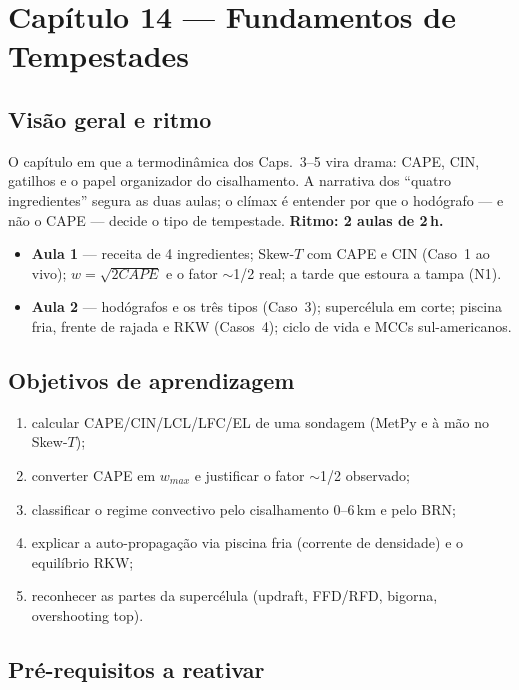 \section{Capítulo 14 --- Fundamentos de Tempestades}

\subsection*{Visão geral e ritmo}

O capítulo em que a termodinâmica dos Caps.~3--5 vira drama: CAPE, CIN,
gatilhos e o papel organizador do cisalhamento. A narrativa dos
``quatro ingredientes'' segura as duas aulas; o clímax é entender por
que o hodógrafo — e não o CAPE — decide o tipo de tempestade.
\textbf{Ritmo: 2 aulas de 2\,h.}

\begin{itemize}
  \item \textbf{Aula 1} — receita de 4 ingredientes; Skew-$T$ com CAPE
        e CIN (Caso~1 ao vivo); $w = \sqrt{2CAPE}$ e o fator
        $\sim$1/2 real; a tarde que estoura a tampa (N1).
  \item \textbf{Aula 2} — hodógrafos e os três tipos (Caso~3);
        supercélula em corte; piscina fria, frente de rajada e RKW
        (Casos~4); ciclo de vida e MCCs sul-americanos.
\end{itemize}

\subsection*{Objetivos de aprendizagem}

\begin{enumerate}
  \item calcular CAPE/CIN/LCL/LFC/EL de uma sondagem (MetPy e à mão no
        Skew-$T$);
  \item converter CAPE em $w_{max}$ e justificar o fator $\sim$1/2
        observado;
  \item classificar o regime convectivo pelo cisalhamento 0--6\,km e
        pelo BRN;
  \item explicar a auto-propagação via piscina fria (corrente de
        densidade) e o equilíbrio RKW;
  \item reconhecer as partes da supercélula (updraft, FFD/RFD,
        bigorna, overshooting top).
\end{enumerate}

\subsection*{Pré-requisitos a reativar}


